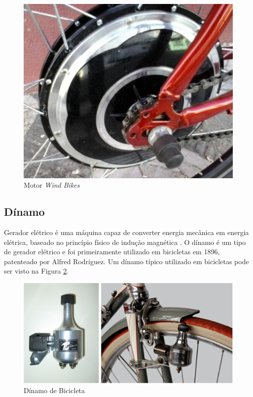 \graphicspath{{figuras/}}
\begin{figure}[h!]
\centering
\includegraphics[scale=0.80]{motor.png}
\caption{Motor \textit{Wind Bikes}}
\label{img:motor}
\end{figure}
	
	\subsection{Dínamo}
	Gerador elétrico é uma máquina capaz de converter energia mecânica em energia elétrica, baseado no princípio físico de indução magnética \cite{maximo}. O dínamo é um tipo de gerador elétrico e foi primeiramente utilizado em bicicletas em 1896, patenteado por Alfred Rodriguez. Um dínamo típico utilizado em bicicletas pode ser visto na Figura \ref{img:dinamo_bicicleta}.
	
	\graphicspath{{figuras/}}
	\begin{figure}[h!]
	\centering
	\includegraphics[scale=0.60]{dinamo_bicicleta}
	\caption{Dínamo de Bicicleta}
	\label{img:dinamo_bicicleta}
	\end{figure}
	
